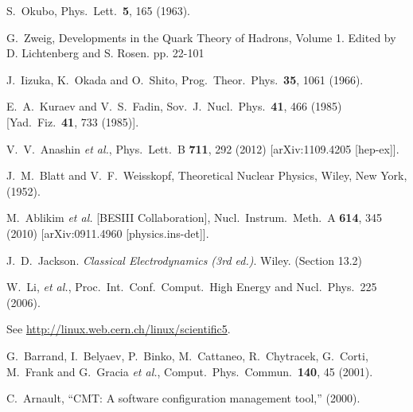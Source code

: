 \begin{thebibliography}{99}
  S.~Okubo,
  Phys.\ Lett.\  {\bf 5}, 165 (1963).

  G.~Zweig,
  Developments in the Quark Theory of Hadrons, Volume 1. Edited by D. Lichtenberg and S. Rosen. pp. 22-101

  J.~Iizuka, K.~Okada and O.~Shito,
  Prog.\ Theor.\ Phys.\  {\bf 35}, 1061 (1966).

  E.~A.~Kuraev and V.~S.~Fadin,
  Sov.\ J.\ Nucl.\ Phys.\  {\bf 41}, 466 (1985)
  [Yad.\ Fiz.\  {\bf 41}, 733 (1985)].

  V.~V.~Anashin {\it et al.},
  Phys.\ Lett.\ B {\bf 711}, 292 (2012)
  [arXiv:1109.4205 [hep-ex]].

  J.~M.~Blatt and V.~F.~Weisskopf,
  Theoretical Nuclear Physics, Wiley, New York, (1952).



  M.~Ablikim {\it et al.}  [BESIII Collaboration],
  Nucl.\ Instrum.\ Meth.\ A {\bf 614}, 345 (2010)
  [arXiv:0911.4960 [physics.ins-det]].

  J.~D.~Jackson.
  {\it Classical Electrodynamics (3rd ed.)}.
  Wiley. (Section 13.2)
 
  W.~Li, {\it et al.},
  Proc.\ Int.\ Conf.\ Comput.\ High Energy and Nucl.\ Phys.\ 225 (2006).

  See \url{http://linux.web.cern.ch/linux/scientific5}.

  G.~Barrand, I.~Belyaev, P.~Binko, M.~Cattaneo, R.~Chytracek, G.~Corti, M.~Frank and G.~Gracia {\it et al.},
  Comput.\ Phys.\ Commun.\  {\bf 140}, 45 (2001).

  C.~Arnault, ``CMT: A software configuration management tool,'' (2000).


\end{thebibliography}
